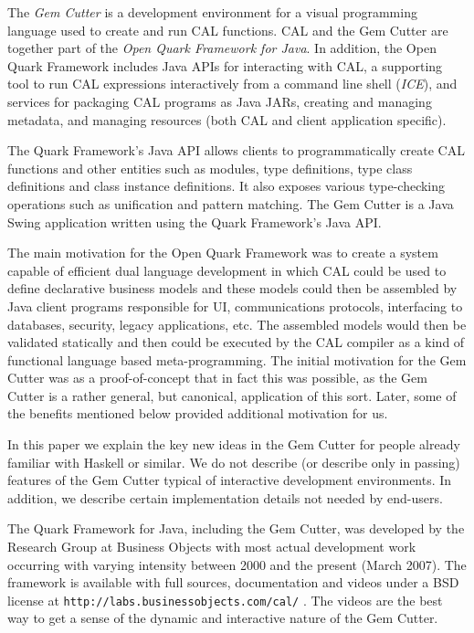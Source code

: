 \documentclass[preprint]{sigplanconf}
\let\cite=\citep
\begin{document}
The {\it Gem Cutter} is a development environment for a visual
programming language used to create and run CAL functions. CAL and the
Gem Cutter are together part of the {\it Open Quark Framework for Java}. In
addition, the Open Quark Framework includes Java APIs for interacting
with CAL, a supporting tool to run CAL expressions interactively from
a command line shell ({\it ICE}), and services for packaging CAL
programs as Java JARs, creating and managing metadata, and managing
resources (both CAL and client application specific).

The Quark Framework's Java API allows clients to programmatically
create CAL functions and other entities such as modules, type
definitions, type class definitions and class instance definitions. It
also exposes various type-checking operations such as unification and
pattern matching.  The Gem Cutter is a Java Swing application written
using the Quark Framework's Java API.

The main motivation for the Open Quark Framework was to create a
system capable of efficient dual language development in which CAL
could be used to define declarative business models and these models
could then be assembled by Java client programs responsible for UI,
communications protocols, interfacing to databases, security, legacy
applications, etc. The assembled models would then be validated
statically and then could be executed by the CAL compiler as a kind of
functional language based meta-programming. The initial motivation for
the Gem Cutter was as a proof-of-concept that in fact this was
possible, as the Gem Cutter is a rather general, but canonical, application of this
sort. Later, some of the benefits mentioned below provided additional
motivation for us.

In this paper we explain the key new ideas in the Gem Cutter for
people already familiar with Haskell or similar. We do not
describe (or describe only in passing) features of the Gem Cutter
typical of interactive development environments. In addition, we describe
certain implementation details not needed by end-users.

The Quark Framework for Java, including the Gem Cutter, was developed
by the Research Group at Business Objects with most actual development
work occurring with varying intensity between 2000 and the present (March 2007). The
framework is available with full sources, documentation and videos under a BSD
license at {\tt http://labs.businessobjects.com/cal/}
\cite{quarkLabsSite_withNoteOnVideos}. The videos are the best way to get a
sense of the dynamic and interactive nature of the Gem Cutter. 
\end{document}
